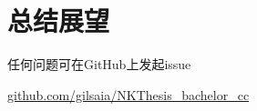 \chapter{总结展望}

任何问题可在GitHub上发起issue 

\href{https://github.com/gilsaia/NKThesis_bachelor_cc}{github.com/gilsaia/NKThesis\_bachelor\_cc}
